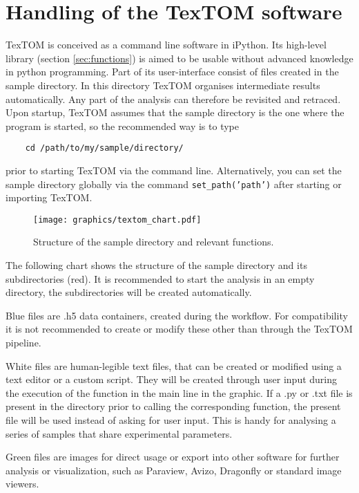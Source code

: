 \section{Handling of the TexTOM software}

TexTOM is conceived as a command line software in iPython.
Its high-level library (section \ref{sec:functions}) is aimed to be usable without
advanced knowledge in python programming.
Part of its user-interface consist of files created in the sample directory. In this directory
TexTOM organises intermediate results automatically. Any part of the analysis can therefore be
revisited and retraced.
Upon startup, TexTOM assumes that the sample directory is the one where the program is started,
so the recommended way is to type
\begin{verbatim}
    cd /path/to/my/sample/directory/
\end{verbatim}
prior to starting TexTOM via the command line.
Alternatively, you can set the sample directory globally via the command \texttt{set\_path('path')} 
after starting or importing TexTOM.

\begin{figure}[h!]
    \texttt{[image: graphics/textom\_chart.pdf]}
    \centering
    \caption{Structure of the sample directory and relevant functions.}
\end{figure}
The following chart shows the structure of the sample directory and its subdirectories (red).
It is recommended to start the analysis in an empty directory, the subdirectories will be
created automatically.

Blue files are .h5 data containers, created during the workflow. For compatibility it is not
recommended to create or modify these other than through the TexTOM pipeline.

White files are human-legible text files, that can be created or modified using a text editor or
a custom script. They will be created through user input during the execution of the function
in the main line in the graphic. 
If a .py or .txt file is present in the directory prior to calling the corresponding function,
the present file will be used instead of asking for user input. This is handy for analysing
a series of samples that share experimental parameters.

Green files are images for direct usage or export into other software for further analysis or visualization,
such as Paraview, Avizo, Dragonfly or standard image viewers.

